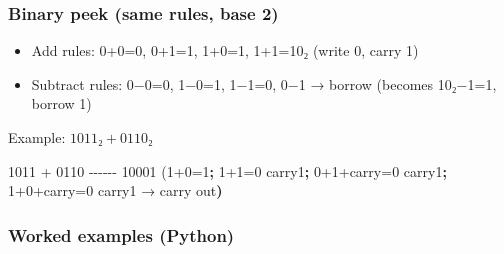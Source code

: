 \documentclass[
  letterpaper,
  DIV=11,
  numbers=noendperiod]{scrreprt}
\newenvironment{Shaded}{\begin{snugshade}}{\end{snugshade}}
\newcommand{\ErrorTok}[1]{\textcolor[rgb]{0.68,0.00,0.00}{#1}}
\newcommand{\ExtensionTok}[1]{\textcolor[rgb]{0.00,0.23,0.31}{#1}}
\newcommand{\KeywordTok}[1]{\textcolor[rgb]{0.00,0.23,0.31}{\textbf{#1}}}
\newcommand{\NormalTok}[1]{\textcolor[rgb]{0.00,0.23,0.31}{#1}}
\begin{document}
\subsubsection{Binary peek (same rules, base
2)}\label{binary-peek-same-rules-base-2}

\begin{itemize}
\item
  Add rules: 0+0=0, 0+1=1, 1+0=1, 1+1=10₂ (write 0, carry 1)
\item
  Subtract rules: 0−0=0, 1−0=1, 1−1=0, 0−1 → borrow (becomes 10₂−1=1,
  borrow 1)
\end{itemize}

Example: \(1011₂ + 0110₂\)

\begin{Shaded}
\begin{Highlighting}[]
   \ExtensionTok{1011}
 \ExtensionTok{+}\NormalTok{ 0110}
 \ExtensionTok{{-}{-}{-}{-}{-}{-}}
  \ExtensionTok{10001}   \ErrorTok{(}\ExtensionTok{1+0=1}\KeywordTok{;} \ExtensionTok{1+1=0}\NormalTok{ carry1}\KeywordTok{;} \ExtensionTok{0+1+carry=0}\NormalTok{ carry1}\KeywordTok{;} \ExtensionTok{1+0+carry=0}\NormalTok{ carry1 → carry out}\KeywordTok{)}
\end{Highlighting}
\end{Shaded}

\subsubsection{Worked examples (Python)}\label{worked-examples-python}
\end{document}
